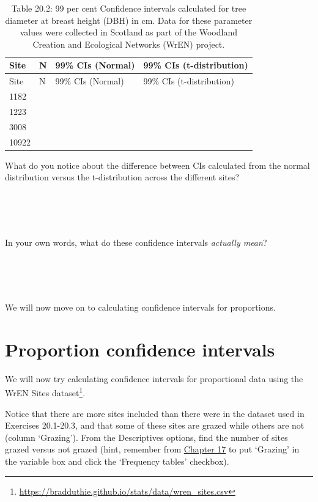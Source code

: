 \documentclass[
]{scrbook}
\begin{document}
\begin{longtable}[]{@{}llll@{}}
\caption{Table 20.2: 99 per cent Confidence intervals calculated for tree diameter at breast height (DBH) in cm. Data for these parameter values were collected in Scotland as part of the Woodland Creation and Ecological Networks (WrEN) project.}\tabularnewline
\toprule
Site & N & 99\% CIs (Normal) & 99\% CIs (t-distribution) \\
\midrule
\endfirsthead
\toprule
Site & N & 99\% CIs (Normal) & 99\% CIs (t-distribution) \\
\midrule
\endhead
1182 & & & \\
1223 & & & \\
3008 & & & \\
10922 & & & \\
\bottomrule
\end{longtable}

What do you notice about the difference between CIs calculated from the normal distribution versus the t-distribution across the different sites?

\begin{verbatim}




\end{verbatim}

In your own words, what do these confidence intervals \emph{actually mean}?

\begin{verbatim}




\end{verbatim}

We will now move on to calculating confidence intervals for proportions.

\hypertarget{proportion-confidence-intervals}{%
\section{Proportion confidence intervals}\label{proportion-confidence-intervals}}

We will now try calculating confidence intervals for proportional data using the WrEN Sites dataset\footnote{\url{https://bradduthie.github.io/stats/data/wren_sites.csv}}.

Notice that there are more sites included than there were in the dataset used in Exercises 20.1-20.3, and that some of these sites are grazed while others are not (column `Grazing').
From the Descriptives options, find the number of sites grazed versus not grazed (hint, remember from \protect\hyperlink{Chapter_17}{Chapter 17} to put `Grazing' in the variable box and click the `Frequency tables' checkbox).
\end{document}
